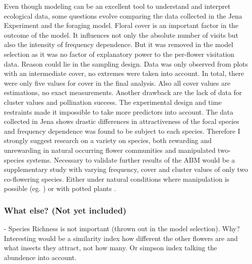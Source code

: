 Even though modeling can be an excellent tool to understand and interpret ecological data, some questions evolve comparing the data collected in the Jena Experiment and the foraging model.
Floral cover is an important factor in the outcome of the model. It influences not only the absolute number of visits but also the intensity of frequency dependence. But it was removed in the model selection as it was no factor of explanatory power to the per-flower visitation data. 
Reason could lie in the sampling design. Data was only observed from plots with an intermediate cover, no extremes were taken into account. In total, there were only five values for cover in the final analysis. Also all cover values are estimations, no exact measurements. Another drawback are the lack of data for cluster values and pollination success. The experimental design and time restraints made it impossible to take more predictors into account. The data collected in Jena shows drastic differences in attractiveness of the focal species and frequency dependence was found to be subject to each species. Therefore I strongly suggest research on a variety on species, both rewarding and unrewarding in natural occurring flower communities and manipulated two-species systems. 
Necessary to validate further results of the ABM would be a supplementary study with varying frequency, cover and cluster values of only two co-flowering species. Either under natural conditions where manipulation is possible (eg. \citealt{Eckhart2006frequency,essenberg2012explaining}) or with potted plants \citep{epperson1987frequency}. 


\subsubsection*{What else? (Not yet included)}

- Species Richness is not important (thrown out in the model selection). Why? 
Interesting would be a similarity index how different the other flowers are and what insects they attract, not how many. Or simpson index talking the abundence into account. 
